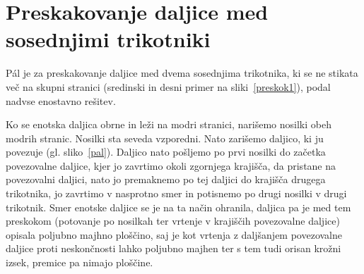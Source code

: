 \documentclass[a4paper, 12pt]{article}
\begin{document}
\section*{Preskakovanje daljice med sosednjimi trikotniki}

Pál je za preskakovanje daljice med dvema sosednjima trikotnika, ki se ne stikata več na skupni stranici (sredinski in desni primer na sliki~\ref{preskok1}), podal nadvse enostavno rešitev.

Ko se enotska daljica obrne in leži na modri stranici, narišemo nosilki obeh modrih stranic. Nosilki sta seveda vzporedni. Nato zarišemo daljico, ki ju povezuje (gl. sliko~\ref{pal}). Daljico nato pošljemo po prvi nosilki do začetka povezovalne daljice, kjer jo zavrtimo okoli zgornjega krajišča, da pristane na povezovalni daljici, nato jo premaknemo po tej daljici do krajišča drugega trikotnika, jo zavrtimo v nasprotno smer in potisnemo po drugi nosilki v drugi trikotnik. Smer enotske daljice se je na ta način ohranila, daljica pa je med tem preskokom (potovanje po nosilkah ter vrtenje v krajiščih povezovalne daljice) opisala poljubno majhno ploščino, saj je kot vrtenja z daljšanjem povezovalne daljice proti neskončnosti lahko poljubno majhen ter s tem tudi orisan krožni izsek, premice pa nimajo ploščine.
\end{document}
